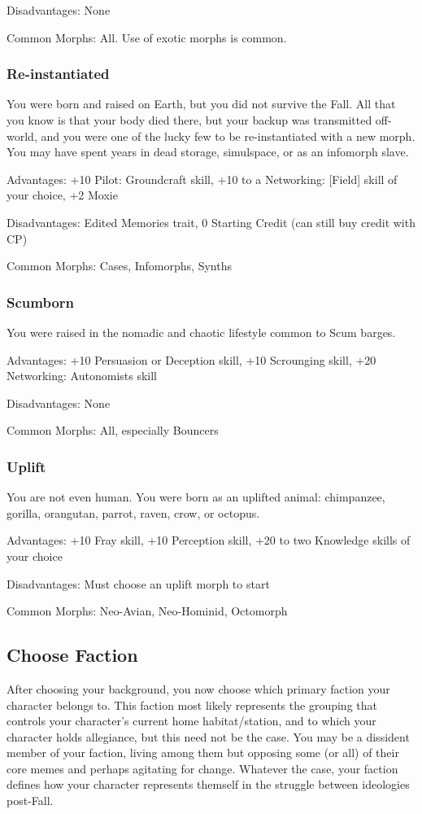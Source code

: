 Disadvantages: None

Common Morphs: All. Use of exotic morphs is common.

\subsubsection{Re-instantiated} %
You were born and raised on Earth, but you did not survive the Fall. All that
you know is that your body died there, but your backup was transmitted
off-world, and you were one of the lucky few to be re-instantiated with a new
morph. You may have spent years in dead storage, simulspace, or as an infomorph
slave.
 
Advantages: +10 Pilot: Groundcraft skill, +10 to a Networking: [Field] skill of
your choice, +2 Moxie
 
Disadvantages: Edited Memories trait, 0 Starting Credit (can still buy credit
with CP)
 
Common Morphs: Cases, Infomorphs, Synths

\subsubsection{Scumborn} %
You were raised in the nomadic and chaotic lifestyle common to Scum barges.
 
Advantages: +10 Persuasion or Deception skill, +10 Scrounging skill, +20
Networking: Autonomists skill
 
Disadvantages: None

Common Morphs: All, especially Bouncers

\subsubsection{Uplift} %
You are not even human. You were born as an uplifted animal: chimpanzee,
gorilla, orangutan, parrot, raven, crow, or octopus.

Advantages: +10 Fray skill, +10 Perception skill, +20 to two Knowledge skills
of your choice

Disadvantages: Must choose an uplift morph to start

Common Morphs: Neo-Avian, Neo-Hominid, Octomorph

\subsection{Choose Faction}
After choosing your background, you now choose which primary faction your
character belongs to.  This faction most likely represents the grouping that
controls your character’s current home habitat/station, and to which your
character holds allegiance, but this need not be the case. You may be a
dissident member of your faction, living among them but opposing some (or all)
of their core memes and perhaps agitating for change. Whatever the case, your
faction defines how your character represents themself in the struggle between
ideologies post-Fall.

